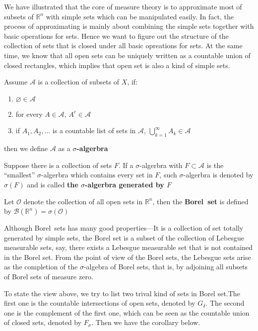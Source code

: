 \documentclass{ctexbook}
\begin{document}
We have illustrated that the core of measure theory is to approximate most of subsets of $\mathbb{R}^n$ with simple sets which
can be manipulated easily. In fact, the process of approximating is mainly about combining the simple sets together with basic
operations for sets. Hence we want to figure out the structure of the collection of sets that is closed under all basic opreations
for sets. At the same time, we know that all open sets can be uniquely written as a countable union of closed rectangles, which
implies that open set is also a kind of simple sets.    

\begin{define}
    Assume $\mathscr{A}$ is a collection of subsets of $X$, if:
    \begin{enumerate}
        \item $\varnothing \in \mathscr{A}$
        \item for every $A \in \mathscr{A}$, $A^c \in \mathscr{A}$
        \item if $A_1,A_2,\ldots$ is a countable list of sets in $\mathscr{A}$, $\bigcup\limits_{k=1}^\infty A_k \in \mathscr{A}$
    \end{enumerate}
    then we define $\mathscr{A}$ as a \textbf{$\sigma$-algerbra}

    Suppose there is a collection of sets $F$. If a $\sigma$-algerbra with $F \subset \mathscr{A}$ is the ``smallest'' $\sigma$-algerbra
    which contains every set in $F$, such $\sigma$-algerbra is denoted by $\sigma(F)$ and is called \textbf{the $\sigma$-algerbra generated by $F$} 
\end{define}

\begin{define}
    Let $\mathcal{O} $ denote the collection of all open sets in $\mathbb{R}^n $, then the \textbf{Borel~set} is defined by
    $\mathscr{B}(\mathbb{R}^n) = \sigma(\mathcal{O})$ 
\end{define}

Although Borel~sets has many good properties---It is a collection of set totally generated by simple sets, the Borel set
is a subset of the collection of Lebesgue measurable sets, say, there exists a Lebesgue measurable set that is not contained
in the Borel set. From the point of view of the Borel sets, the Lebesgue sets arise as the completion of the $\sigma$-algebra
of Borel sets, that is, by adjoining all subsets of Borel sets of measure zero.

To state the view above, we try to list two trival kind of sets in Borel set.The first one is the countable intersections of
open sets, denoted by $G_{\delta}$. The second one is the complement of the first one, which can be seen as the countable union
of closed sets, denoted by $F_{\sigma}$. Then we have the corollary below.
\end{document}
